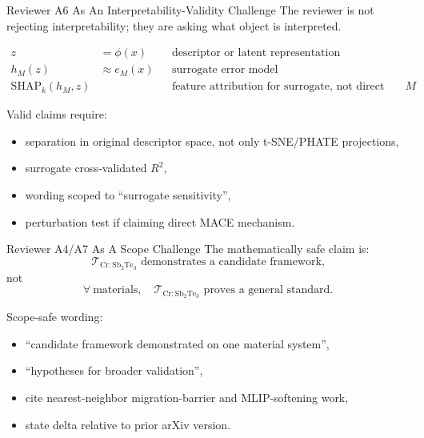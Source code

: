 \documentclass[aspectratio=169,10pt]{beamer}
\begin{document}
\begin{frame}{Reviewer A6 As An Interpretability-Validity Challenge}
  The reviewer is not rejecting interpretability; they are asking what object is interpreted.

  \vspace{0.2cm}
  \begin{align*}
  z &= \phi(x) && \text{descriptor or latent representation}\\
  h_M(z) &\approx e_M(x) && \text{surrogate error model}\\
  \mathrm{SHAP}_k(h_M,z) & && \text{feature attribution for surrogate, not direct proof about } M
  \end{align*}

  \vspace{0.2cm}
  Valid claims require:
  \begin{itemize}
    \item separation in original descriptor space, not only t-SNE/PHATE projections,
    \item surrogate cross-validated $R^2$,
    \item wording scoped to ``surrogate sensitivity'',
    \item perturbation test if claiming direct MACE mechanism.
  \end{itemize}
\end{frame}

\begin{frame}{Reviewer A4/A7 As A Scope Challenge}
  The mathematically safe claim is:
  \[
  \mathcal{T}_{\mathrm{Cr:Sb_2Te_3}}
  \text{ demonstrates a candidate framework,}
  \]
  not
  \[
  \forall\ \text{materials},\quad
  \mathcal{T}_{\mathrm{Cr:Sb_2Te_3}}
  \text{ proves a general standard.}
  \]

  \vspace{0.25cm}
  Scope-safe wording:
  \begin{itemize}
    \item ``candidate framework demonstrated on one material system'',
    \item ``hypotheses for broader validation'',
    \item cite nearest-neighbor migration-barrier and MLIP-softening work,
    \item state delta relative to prior arXiv version.
  \end{itemize}
\end{frame}
\end{document}
